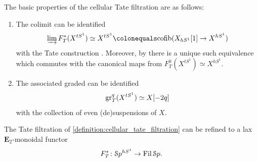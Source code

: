 \documentclass[oneside,a4paper]{amsart}
\begin{document}
\begin{recollection}
\label{recollection:properties_of_the_bt_tate_filtration}
The basic properties of the cellular Tate filtration are as follows: 

\begin{enumerate}
    \item The colimit can be identified
    \[
    \varinjlim F^{\ast}_{T}(X^{tS^{1}}) \simeq X^{tS^{1}} \colonequals \mathrm{cofib}(X_{hS^{1}}[1] \rightarrow X^{hS^{1}})
    \]
    with the Tate construction \cite[{Proposition B.6}]{BalsPeriodicCyclicHomology}. Moreover, by \cite[{Theorem I.4.1}]{nikolaus-scholze} there is a unique such equivalence which commutes with the canonical maps from $F^{0}_{T}(X^{tS^{1}}) \simeq X^{hS^{1}}$. 
    \item The associated graded can be identified 
    \[
    \operatorname{gr}^{q}_{T}(X^{tS^{1}}) \simeq X[-2q]
    \]
    with the collection of even (de)suspensions of $X$. 
\end{enumerate}
\end{recollection}

\begin{theorem}
\label{theorem:lax_monoidal_structure_on_the_tate_filtration}
The Tate filtration of \cref{definition:cellular_tate_filtration} can be refined to a lax $\mathbf{E}_{2}$-monoidal functor 
\[
F_{T}^{\ast} \colon \EuScript{S}p^{hS^{1}} \rightarrow \operatorname{Fil} \EuScript{S}p.  
\]
\end{theorem}
\end{document}
